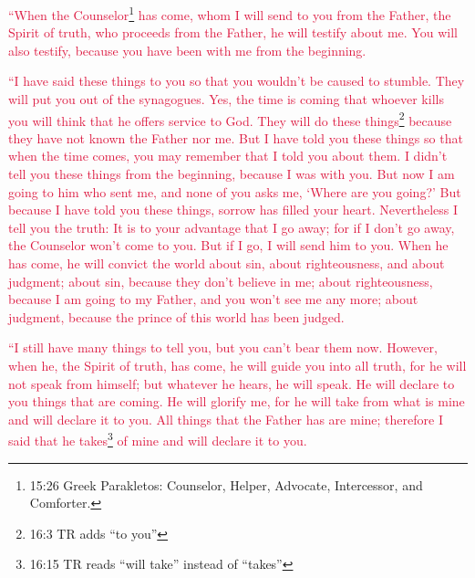 \myverse{}\textcolor{crimson}{“When the Counselor}\footnote{15:26 Greek Parakletos: Counselor, Helper, Advocate, Intercessor, and Comforter.}
\textcolor{crimson}{has come, whom I will send to you from the Father, the Spirit of truth, who proceeds from the Father,
	he will testify about me.
}
\myverse{}\textcolor{crimson}{You will also testify, because you have been with me from the beginning.}


\mychapter{} \myverse*{}\textcolor{crimson}{“I have said these things to you so that you wouldn’t be caused
	to stumble.
}
\myverse{}\textcolor{crimson}{They will put you out of the synagogues. Yes, the time is coming that whoever
	kills you will think that he offers service to God.
}
\myverse{}\textcolor{crimson}{They will do these things}\footnote{16:3 TR adds “to you”}
\textcolor{crimson}{because they have not known the Father nor me.
}
\myverse{}\textcolor{crimson}{But I have told you these things so that when the time comes, you may remember
	that I told you about them. I didn’t tell you these things from the beginning, because I was with you.
}
\myverse{}\textcolor{crimson}{But now I am going to him who sent me, and none of you asks me, ‘Where
	are you going?’
}
\myverse{}\textcolor{crimson}{But because I have told you these things, sorrow has filled your heart.
}
\myverse{}\textcolor{crimson}{Nevertheless I tell you the truth: It is to your advantage that I go away;
	for if I don’t go away, the Counselor won’t come to you. But if I go, I will send him to you.
}
\myverse{}\textcolor{crimson}{When he has come, he will convict the world about sin, about righteousness,
	and about judgment;
}
\myverse{}\textcolor{crimson}{about sin, because they don’t believe in me;
}
\myverse{}\textcolor{crimson}{about righteousness, because I am going to my Father, and you won’t see
	me any more;
}
\myverse{}\textcolor{crimson}{about judgment, because the prince of this world has been judged.
}

\myverse{}\textcolor{crimson}{“I still have many things to tell you, but you can’t bear
	them now.
}
\myverse{}\textcolor{crimson}{However, when he, the Spirit of truth, has come, he will guide you into
	all truth, for he will not speak from himself; but whatever he hears, he will speak. He will declare to
	you things that are coming.
}
\myverse{}\textcolor{crimson}{He will glorify me, for he will take from what is mine and will declare
	it to you.
}
\myverse{}\textcolor{crimson}{All things that the Father has are mine; therefore I said that he takes}\footnote{16:15 TR reads “will take” instead of “takes”}
\textcolor{crimson}{of mine and will declare it to you.
}

